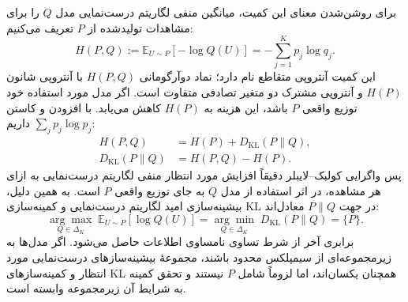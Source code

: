 برای روشن‌شدن معنای این کمیت، میانگین منفی لگاریتم درست‌نمایی مدل $Q$ را برای مشاهدات تولیدشده از $P$ تعریف می‌کنیم:
\begin{equation}\label{eq:app-pd-cross-entropy}
H(P,Q):=\mathbb E_{U\sim P}[-\log Q(U)]
=-\sum_{j=1}^{K}p_j\log q_j.
\end{equation}
این کمیت آنتروپی متقاطع نام دارد؛ نماد دوآرگومانی $H(P,Q)$ با آنتروپی شانون $H(P)$ و آنتروپی مشترک دو متغیر تصادفی متفاوت است. اگر مدل مورد استفاده خود توزیع واقعی $P$ باشد، این هزینه به $H(P)$ کاهش می‌یابد. با افزودن و کاستن $\sum_jp_j\log p_j$ داریم:
\begin{equation}\label{eq:app-pd-kl-excess-nll}
\boxed{
\begin{aligned}
H(P,Q)&=H(P)+D_{\mathrm{KL}}(P\|Q),\\
D_{\mathrm{KL}}(P\|Q)&=H(P,Q)-H(P).
\end{aligned}
}
\end{equation}
پس واگرایی کولبک--لایبلر دقیقاً افزایش مورد انتظار منفی لگاریتم درست‌نمایی به ازای هر مشاهده، در اثر استفاده از مدل $Q$ به جای توزیع واقعی $P$ است. به همین دلیل، بیشینه‌سازی امید لگاریتم درست‌نمایی و کمینه‌سازی KL در جهت $P\|Q$ معادل‌اند:
\begin{equation}\label{eq:app-pd-kl-expected-mle}
\underset{Q\in\Delta_K}{\arg\max}\;
\mathbb E_{U\sim P}[\log Q(U)]
=
\underset{Q\in\Delta_K}{\arg\min}\;
D_{\mathrm{KL}}(P\|Q)
=\{P\}.
\end{equation}
برابری آخر از شرط تساوی نامساوی اطلاعات حاصل می‌شود. اگر مدل‌ها به زیرمجموعه‌ای از سیمپلکس محدود باشند، مجموعهٔ بیشینه‌سازهای درست‌نمایی مورد انتظار و کمینه‌سازهای KL همچنان یکسان‌اند، اما لزوماً شامل $P$ نیستند و تحقق کمینه به شرایط آن زیرمجموعه وابسته است.

